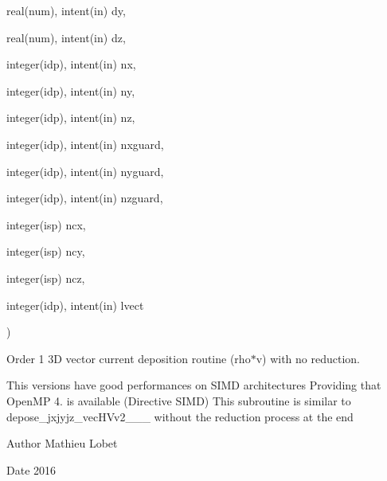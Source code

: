 {\begin{DoxyParamCaption}
\item[{real(num), intent(in)}]{dy, }
\item[{real(num), intent(in)}]{dz, }
\item[{integer(idp), intent(in)}]{nx, }
\item[{integer(idp), intent(in)}]{ny, }
\item[{integer(idp), intent(in)}]{nz, }
\item[{integer(idp), intent(in)}]{nxguard, }
\item[{integer(idp), intent(in)}]{nyguard, }
\item[{integer(idp), intent(in)}]{nzguard, }
\item[{integer(isp)}]{ncx, }
\item[{integer(isp)}]{ncy, }
\item[{integer(isp)}]{ncz, }
\item[{integer(idp), intent(in)}]{lvect}
\end{DoxyParamCaption}
)}\hypertarget{current__deposition_8_f90_a640df01330ec2f2b5ffcb43938a71db5}{}\label{current__deposition_8_f90_a640df01330ec2f2b5ffcb43938a71db5}


Order 1 3D vector current deposition routine (rho$\ast$v) with no reduction. 

This versions have good performances on S\+I\+MD architectures Providing that Open\+MP 4. is available (Directive S\+I\+MD) This subroutine is similar to depose\+\_\+jxjyjz\+\_\+vec\+H\+Vv2\+\_\+\_\+\_ without the reduction process at the end \begin{DoxyAuthor}{Author}
Mathieu Lobet 
\end{DoxyAuthor}
\begin{DoxyDate}{Date}
2016 
\end{DoxyDate}

